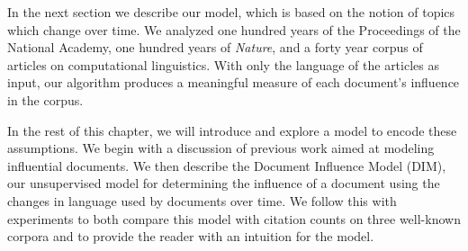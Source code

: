 In the next section we describe our model, which is based on the
notion of topics which change over time.  We analyzed one hundred
years of the Proceedings of the National Academy, one hundred years of
\textit{Nature}, and a forty year corpus of articles on computational
linguistics.  With only the language of the articles as input, our
algorithm produces a meaningful measure of each document's influence
in the corpus.

In the rest of this chapter, we will introduce and explore a model to
encode these assumptions.  We begin with a discussion of previous work
aimed at modeling influential documents.  We then describe the
Document Influence Model (DIM), our unsupervised model for determining the
influence of a document using the changes in language used by
documents over time.  We follow this with experiments to both compare
this model with citation counts on three well-known corpora and to
provide the reader with an intuition for the model.